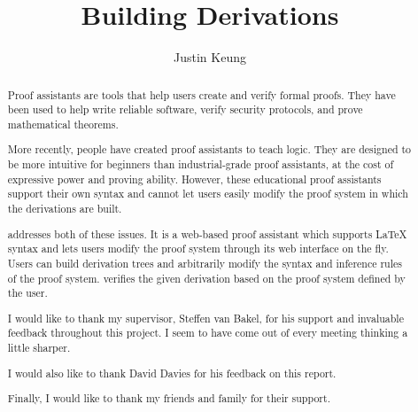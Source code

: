 \documentclass[a4paper, twoside, 11pt]{report}
\title{Building Derivations}
\author{Justin Keung}
\begin{document}


\begin{abstract}
Proof assistants are tools that help users create and verify formal proofs. They have been used to help write reliable software, verify security protocols, and prove mathematical theorems.

More recently, people have created proof assistants to teach logic. They are designed to be more intuitive for beginners than industrial-grade proof assistants, at the cost of expressive power and proving ability. However, these educational proof assistants  support their own syntax and cannot let users easily modify the proof system in which the derivations are built.

\projectname{} addresses both of these issues. It is a web-based proof assistant which supports \LaTeX{} syntax and lets users modify the proof system through its web interface on the fly. Users can build derivation trees and arbitrarily modify the syntax and inference rules of the proof system. \projectname{} verifies the given derivation based on the proof system defined by the user.

\end{abstract}

\renewcommand{\abstractname}{Acknowledgements}
\begin{abstract}
I would like to thank my supervisor, Steffen van Bakel, for his support and invaluable feedback throughout this project. I seem to have come out of every meeting thinking a little sharper.

I would also like to thank David Davies for his feedback on this report.

Finally, I would like to thank my friends and family for their support.
\end{abstract}

\pagestyle{toc}
\tableofcontents
\listoffigures

\pagestyle{fancy}








% 

\DeclareRobustCommand{\VAN}[3]{#3}
\printbibliography

\pagebreak

\end{document}
